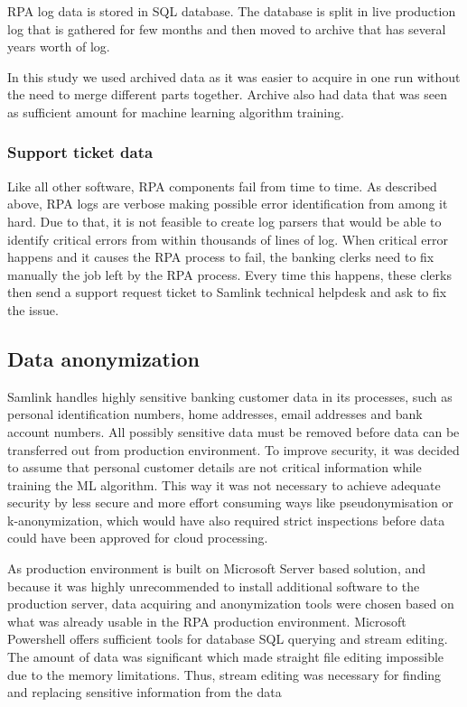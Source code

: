 \documentclass[english, 12pt, a4paper, elec, utf8, a-1b, online]{aaltothesis}
\begin{document}
RPA log data is stored in SQL database.
The database is split in live production log
that is gathered for few months %
and then moved to archive that has
several years worth of log.

In this study we used archived data
as it was easier to acquire in one run
without the need to merge different parts together.
Archive also had %
data that was seen as sufficient amount
for machine learning algorithm training.


\subsubsection*{Support ticket data}
Like all other software,
RPA components fail from time to time.
As described above, %
RPA logs are verbose
making possible error identification from among it hard.
Due to that,
it is not feasible to create log parsers
that would be able to identify critical errors
from within thousands of lines of log.
When critical error happens
and it causes the RPA process to fail,
the banking clerks need to fix manually
the job left by the RPA process.
Every time this happens,
these clerks then send a support request ticket
to Samlink technical helpdesk
and ask to fix the issue.



\subsection{Data anonymization}\label{subsec:data-anonymization}
Samlink handles highly sensitive banking customer data in its processes,
such as personal identification numbers, home addresses, email addresses and bank account numbers.
All possibly sensitive data must be removed
before data can be transferred out from production environment.
To improve security,
it was decided to assume
that personal customer details are not critical information
while training the ML algorithm.
This way it was not necessary to achieve adequate security
by less secure and more effort consuming ways
like pseudonymisation or k-anonymization,
which would have also required strict inspections
before data could have been approved for cloud processing.

As production environment is built on Microsoft Server based solution,
and because it was highly unrecommended
to install additional software to the production server,
data acquiring and anonymization tools were chosen
based on what was already usable in the RPA production environment.
Microsoft Powershell offers sufficient tools
for database SQL querying
and stream editing.
The amount of data was significant
which made straight file editing impossible
due to the memory limitations.
Thus, stream editing was necessary
for finding and replacing
sensitive information from the data
\end{document}
